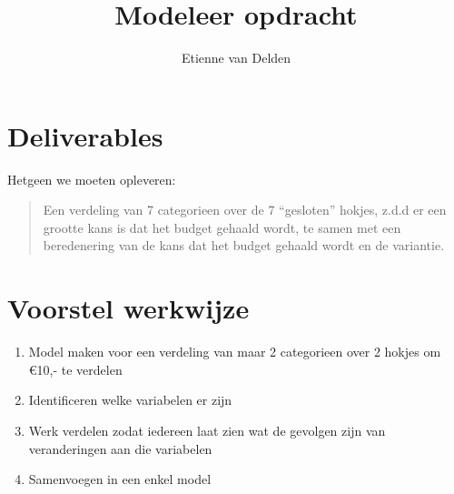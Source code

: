 \documentclass[a4paper, twosided, article]{memoir}
\title{Modeleer opdracht}
\author{Etienne van Delden}
\begin{document}
\maketitle
\tableofcontents

\chapter{Deliverables}
Hetgeen we moeten opleveren: 
\begin{quote}
  Een verdeling van 7 categorieen over de 7 ``gesloten'' hokjes, z.d.d er een grootte kans is dat het budget gehaald wordt, te samen met een beredenering van de kans dat het budget gehaald wordt en de variantie.
\end{quote}

\chapter{Voorstel werkwijze}

  \begin{enumerate}
    \item Model maken voor een verdeling van maar 2 categorieen over 2 hokjes om €10,- te verdelen
    \item Identificeren welke variabelen er zijn
    \item Werk verdelen zodat iedereen laat zien wat de gevolgen zijn van veranderingen aan die variabelen
    \item Samenvoegen in een enkel model
  \end{enumerate}
\end{document}
